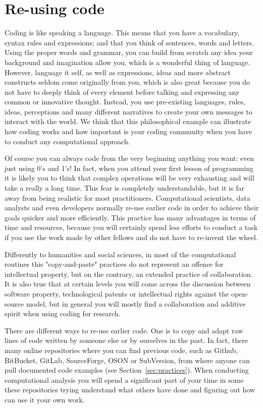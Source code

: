 \section{Re-using code}
\label{sec:code}

Coding is like speaking a language. This means that you have a vocabulary, syntax rules and expressions; and that you think of sentences, words and letters. Using the proper words and grammar, you can build from scratch any idea your background and imagination allow you, which is a wonderful thing of language. However, language it self, as well as expressions, ideas and more abstract constructs seldom come originally from you, which is also great because you do not have to deeply think of every element before talking and expressing any common or innovative thought. Instead, you use pre-existing languages, rules, ideas, perceptions and many different narratives to create your own messages to interact with the world. We think that this philosophical example can illustrate how coding works and how important is your coding community when you have to conduct any computational approach.

Of course you can always code from the very beginning anything you want: even just using 0's and 1's! In fact, when you attend your first lesson of programming it is likely you to think that complex operations will be very exhausting and will take a really a long time. This fear is completely understandable, but it is far away from being realistic for most practitioners. Computational scientists, data analysts and even developers normally re-use earlier code in order to achieve their goals quicker and more efficiently. This practice has many advantages in terms of time and resources, because you will certainly spend less efforts to conduct a task if you use the work made by other fellows and do not have to re-invent the wheel.

Differently to humanities and social sciences, in most of the computational routines this "copy-and-paste" practices do not represent an offence for intellectual property, but on the contrary, an extended practice of collaboration. It is also true that at certain levels you will come across the discussion between software property, technological patents or intellectual rights against the open-source model, but in general you will mostly find a collaboration and additive spirit when using coding for research.

There are different ways to re-use earlier code. One is to copy and adapt raw lines of code written by someone else or by ourselves in the past. In fact, there many online repositories where you can find previous code, such as Github, BitBucket, GitLab, SourceForge, OSON or SubVersion, from where anyone can pull documented code examples (see Section~\ref{sec:practices}). When conducting computational analysis you will spend a significant part of your time in some these repositories trying understand what others have done and figuring out how can use it your own work.

